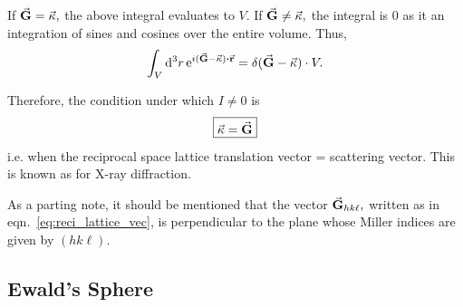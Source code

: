 	If $\va{G} = \va{\kappa},$ the above integral evaluates to $V.$ If $\va{G} \ne \va{\kappa},$ the integral is $0$ as it an integration of sines and cosines over the entire volume. Thus,%
%	
	\begin{equation}
	\int_V \dd[3]{r} \e{ i (\va{G} - \va{\kappa}) \vdot \va{r} } = \delta ( \va{G} - \va{\kappa} ) \cdot V.
	\end{equation}
	
	Therefore, the condition under which $I \ne 0$ is%
%	
	\begin{equation}
	\boxed{\va{\kappa} = \va{G}}
	\end{equation}%
%	
	i.e. when the reciprocal space lattice translation vector = scattering vector. This is known as  for X-ray diffraction.
	
	As a parting note, it should be mentioned that the vector $\va{G}_{hk\ell},$ written as in eqn.~\eqref{eq:reci_lattice_vec}, is perpendicular to the plane whose Miller indices are given by $(h k \ell).$
		

\subsection{Ewald's Sphere}
	
